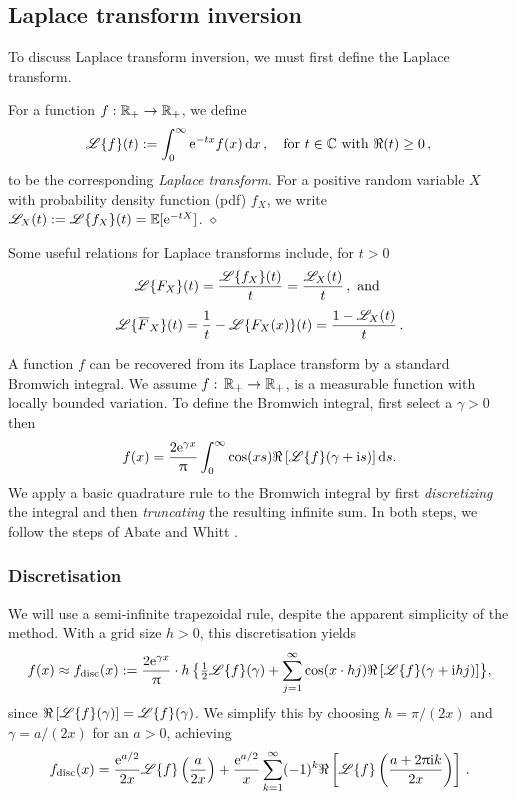 \subsection{Laplace transform inversion} \label{sec:laplace_inversion}

To discuss Laplace transform inversion, we must first define the Laplace transform.

\begin{definition} \label{def:TransformDefs} For a function $f : \mathbb{R}_+ \to \mathbb{R}_+$, we define
\[
	\mathscr{L}\{f\}(t) := \int_{0}^{\infty} \mathrm{e}^{-t x} f(x) \mathop{}\!\mathrm{d} x\,, \quad \text{for } t \in \mathbb{C} \text{ with } \Re(t) \ge 0 \,, \\
\]
to be the corresponding \emph{Laplace transform}.
For a positive random variable $X$ with probability density function (pdf) $f_X$, we write $\mathscr{L}_{X}(t) := \mathscr{L}\{f_X\}(t) = \operatorname{{\mathbb E}}[\mathrm{e}^{-tX}]$. \hfill $\diamond$
\end{definition}
Some useful relations for Laplace transforms include, for $t>0$
\[ \mathscr{L}\{ F_X \}(t) = \frac{\mathscr{L}\{f_X\}(t)}{t} = \frac{\mathscr{L}_{X}(t)}{t} \,, \text{ and } \]
\[ \LT{ \Ftail_X }(t) = \frac1t - \LT{F_X(x) }(t) = \frac{1 - \LTsub{X}(t)}{t}  \,. \]

A function $f$ can be recovered from its Laplace transform by a standard Bromwich integral.
We assume $f:\,\mathbb{R}_+ \to \mathbb{R}_+$, is a measurable function with locally bounded variation.
To define the Bromwich integral, first select a $\gamma > 0$ then
\[
f(x)=\frac{2\mathrm{e}^{\gamma x}}{\uppi}\int_{0}^{\infty}\cos(xs)\Re\left[\mathscr{L}\{f\}(\gamma + \mathrm{i} s)\right]\mathop{}\!\mathrm{d} s.
\]
We apply a basic quadrature rule to the Bromwich integral by first \emph{discretizing} the integral and then \emph{truncating} the resulting infinite sum. In both steps, we follow the steps of Abate and Whitt \cite{Abate1992}.

\subsubsection{Discretisation} \label{Sub:Discretization}

We will use a semi-infinite trapezoidal rule, despite the apparent simplicity of the method.
With a grid size $h>0$, this discretisation yields
\[
f(x) \approx f_{\mathrm{disc}}(x) := \frac{2\mathrm{e}^{\gamma x}}{\uppi} \cdot h \, \bigl \{ \tfrac12 \mathscr{L}\{f\}(\gamma) + \sum_{j=1}^\infty  \cos(x \cdot hj)\Re\left[\mathscr{L}\{f\}(\gamma + \mathrm{i} hj)\right] \bigr \},
\]
since  $\Re\left[\mathscr{L}\{f\}(\gamma)\right] = \mathscr{L}\{f\}(\gamma)$. We simplify this by choosing $h = \pi/(2 x)$ and $\gamma = a / (2 x)$ for an $a > 0$, achieving
\begin{equation} \label{DiscretizedInversion}
f_{\mathrm{disc}}(x) = \frac{\mathrm{e}^{a/2}}{2x}\mathscr{L}\{f\} \left(\frac{a}{2 x}\right) + \frac{\mathrm{e}^{a/2}}{x} \sum_{k=1}^\infty (-1)^{k} \Re\left[\mathscr{L}\{f\}\left(\frac{a+ 2\uppi \mathrm{i} k}{2 x}\right)\right] \,.
\end{equation}

